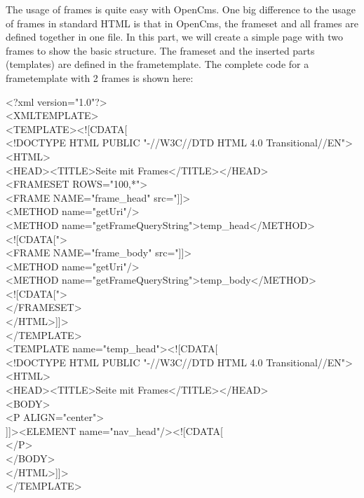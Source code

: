 The usage of frames is quite easy with OpenCms. One big difference
to the usage of frames in standard HTML is that in OpenCms,
the frameset and all frames are defined together in one file.  In this part, we will
create a simple page with two frames to show the basic structure.
The frameset and the inserted parts (templates) are defined in the
frametemplate. The complete code for a frametemplate with 2 frames
is shown here:
\begin{xml}
<?xml version="1.0"?>\\
<XMLTEMPLATE>\\

<TEMPLATE><![CDATA[\\
<!DOCTYPE HTML PUBLIC "-//W3C//DTD HTML 4.0 Transitional//EN">\\
<HTML>\\
  <HEAD><TITLE>Seite mit Frames</TITLE></HEAD>\\
  <FRAMESET ROWS="100,*">\\
\xtaba     <FRAME NAME="frame\_head" src="]]>\\
\xtabb <METHOD name="getUri"/>\\
\xtabb            <METHOD name="getFrameQueryString">temp\_head</METHOD>\\
\xtabb            <![CDATA[">\\
\xtaba     <FRAME NAME="frame\_body" src="]]>\\
\xtabb            <METHOD name="getUri"/>\\
\xtabb            <METHOD name="getFrameQueryString">temp\_body</METHOD>\\
\xtabb            <![CDATA[">\\
  </FRAMESET>\\
</HTML>]]>\\
</TEMPLATE>\\
<TEMPLATE name="temp\_head"><![CDATA[\\
\xtaba <!DOCTYPE HTML PUBLIC "-//W3C//DTD HTML 4.0 Transitional//EN">\\
\xtaba <HTML>\\
\xtaba   <HEAD><TITLE>Seite mit Frames</TITLE></HEAD>\\
\xtaba   <BODY>\\
\xtabb             <P ALIGN="center">\\
\xtabb       ]]><ELEMENT name="nav\_head"/><![CDATA[\\
\xtabb     </P>\\
\xtaba   </BODY>\\
\xtaba </HTML>]]>\\
</TEMPLATE>\\


\end{xml}
